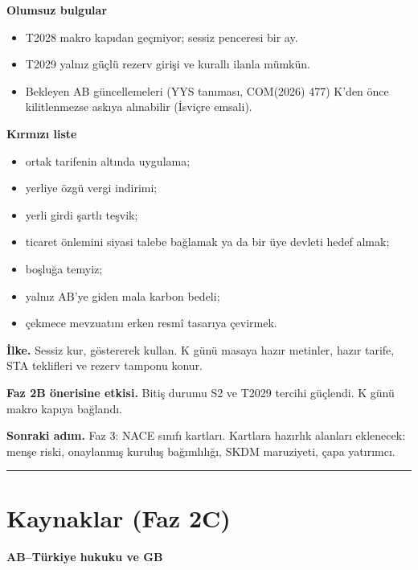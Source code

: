 \textbf{Olumsuz bulgular}

\begin{itemize}
\tightlist
\item
  T2028 makro kapıdan geçmiyor; sessiz penceresi bir ay.
\item
  T2029 yalnız güçlü rezerv girişi ve kurallı ilanla mümkün.
\item
  Bekleyen AB güncellemeleri (YYS tanıması, COM(2026) 477) K'den önce kilitlenmezse askıya alınabilir (İsviçre emsali).
\end{itemize}

\textbf{Kırmızı liste}

\begin{itemize}
\tightlist
\item
  ortak tarifenin altında uygulama;
\item
  yerliye özgü vergi indirimi;
\item
  yerli girdi şartlı teşvik;
\item
  ticaret önlemini siyasi talebe bağlamak ya da bir üye devleti hedef almak;
\item
  boşluğa temyiz;
\item
  yalnız AB'ye giden mala karbon bedeli;
\item
  çekmece mevzuatını erken resmî tasarıya çevirmek.
\end{itemize}

\textbf{İlke.} Sessiz kur, göstererek kullan. K günü masaya hazır metinler, hazır tarife, STA teklifleri ve rezerv tamponu konur.

\textbf{Faz 2B önerisine etkisi.} Bitiş durumu S2 ve T2029 tercihi güçlendi. K günü makro kapıya bağlandı.

\textbf{Sonraki adım.} Faz 3: NACE sınıfı kartları. Kartlara hazırlık alanları eklenecek: menşe riski, onaylanmış kuruluş bağımlılığı, SKDM maruziyeti, çapa yatırımcı.

\begin{center}\rule{0.5\linewidth}{0.5pt}\end{center}

\hypertarget{02c_hazirlik-kaynaklar-faz-2c}{%
\section{Kaynaklar (Faz 2C)}\label{02c_hazirlik-kaynaklar-faz-2c}}

\textbf{AB--Türkiye hukuku ve GB}

